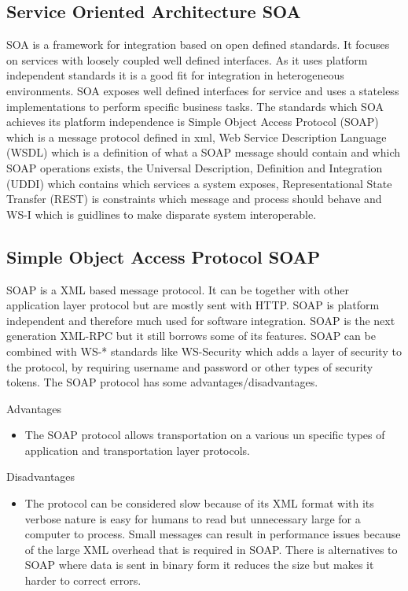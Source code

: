 \documentclass{llncs}
\begin{document}
\subsection{Service Oriented Architecture SOA}
SOA is a framework for integration based on open defined standards. It focuses on services with  loosely coupled well defined interfaces. As it uses platform independent standards it is a good fit for integration in heterogeneous environments. SOA exposes well defined interfaces for service and uses a stateless implementations to perform specific business tasks. The standards which SOA achieves its platform independence is Simple Object Access Protocol (SOAP) which is a message protocol defined in xml, Web Service Description Language (WSDL) which is a definition of what a SOAP message should contain and which SOAP operations exists, the Universal Description, Definition and Integration (UDDI) which contains which services a system exposes, Representational State Transfer (REST) is constraints which message and process should behave and WS-I which is guidlines to make disparate system interoperable.

\subsection{Simple Object Access Protocol SOAP}
SOAP is a XML based message protocol. It can be together with other application layer protocol but are mostly sent with HTTP. SOAP is platform independent and therefore much used for software  integration. SOAP is the next generation XML-RPC but it still borrows some of its features. SOAP can be combined with WS-* standards like WS-Security which adds a layer of security to the protocol, by requiring username and password or other types of security tokens. The SOAP protocol has some advantages/disadvantages.

Advantages
\begin{itemize}
\item The SOAP protocol allows transportation on a various un specific types of application and transportation layer protocols.
\end{itemize}
Disadvantages
\begin{itemize}
\item The protocol can be considered slow because of its XML format with its verbose nature is easy for humans to read but unnecessary large for a computer to process. Small messages can result in performance issues because of the large XML overhead that is required in SOAP. There is alternatives to SOAP where data is sent in binary form it reduces the size but makes it harder to correct errors.
\end{itemize}
\end{document}
